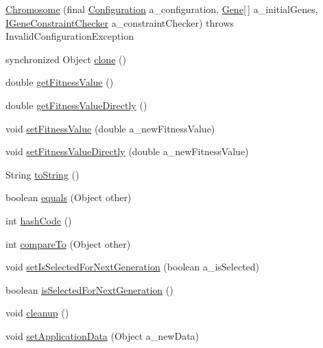 \begin{DoxyCompactItemize}
\item 
\hyperlink{classorg_1_1jgap_1_1_chromosome_ab836c132fb64477cad4d0a2e3b997d6f}{Chromosome} (final \hyperlink{classorg_1_1jgap_1_1_configuration}{Configuration} a\-\_\-configuration, \hyperlink{interfaceorg_1_1jgap_1_1_gene}{Gene}\mbox{[}$\,$\mbox{]} a\-\_\-initial\-Genes, \hyperlink{interfaceorg_1_1jgap_1_1_i_gene_constraint_checker}{I\-Gene\-Constraint\-Checker} a\-\_\-constraint\-Checker)  throws Invalid\-Configuration\-Exception 
\item 
synchronized Object \hyperlink{classorg_1_1jgap_1_1_chromosome_a9f590d55a34d8b99c2a9a1b4aedd568b}{clone} ()
\item 
double \hyperlink{classorg_1_1jgap_1_1_chromosome_a9ccc6c05aa9c785d1cbae40acc90c80c}{get\-Fitness\-Value} ()
\item 
double \hyperlink{classorg_1_1jgap_1_1_chromosome_ad0c53486ddb583ddbee2bede065ae068}{get\-Fitness\-Value\-Directly} ()
\item 
void \hyperlink{classorg_1_1jgap_1_1_chromosome_a3715ce380f59756a954566a315514ed0}{set\-Fitness\-Value} (double a\-\_\-new\-Fitness\-Value)
\item 
void \hyperlink{classorg_1_1jgap_1_1_chromosome_a4fb0934f7919084f0b5e9ca132e6aaa6}{set\-Fitness\-Value\-Directly} (double a\-\_\-new\-Fitness\-Value)
\item 
String \hyperlink{classorg_1_1jgap_1_1_chromosome_a9cedcb4abe7b9e5f5cfd6cfea0cd949d}{to\-String} ()
\item 
boolean \hyperlink{classorg_1_1jgap_1_1_chromosome_ac75a21fd23483ff275422e0791289ac8}{equals} (Object other)
\item 
int \hyperlink{classorg_1_1jgap_1_1_chromosome_a9f3e1fc14f84b25f09386a2dd1fc69d9}{hash\-Code} ()
\item 
int \hyperlink{classorg_1_1jgap_1_1_chromosome_a2be0507944e2ca98bef8372402b33e13}{compare\-To} (Object other)
\item 
void \hyperlink{classorg_1_1jgap_1_1_chromosome_a1249d045c9830c9dc76e14e4dbe20f5f}{set\-Is\-Selected\-For\-Next\-Generation} (boolean a\-\_\-is\-Selected)
\item 
boolean \hyperlink{classorg_1_1jgap_1_1_chromosome_a61d28f792a1389214f06a88dba42260d}{is\-Selected\-For\-Next\-Generation} ()
\item 
void \hyperlink{classorg_1_1jgap_1_1_chromosome_ab608acb21ff95b3fe2ff9667a207fd72}{cleanup} ()
\item 
void \hyperlink{classorg_1_1jgap_1_1_chromosome_a03e0d17b0df1765a442f76645aa4e5b8}{set\-Application\-Data} (Object a\-\_\-new\-Data)

\end{DoxyCompactItemize}
